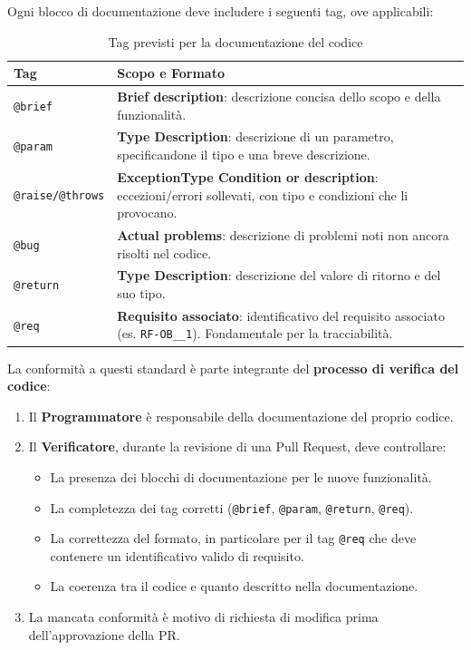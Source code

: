 Ogni blocco di documentazione deve includere i seguenti tag, ove applicabili:
\begin{table}[H]
	\centering
	\renewcommand{\arraystretch}{1.15}
	\begin{tabular}{|p{}|p{}|}
	    \hline
	    \textbf{Tag} & \textbf{Scopo e Formato} \\
	    \hline
	    \texttt{@brief} & \textbf{Brief description}: descrizione concisa dello scopo e della funzionalità. \\
	    \hline
	    \texttt{@param} & \textbf{Type Description}: descrizione di un parametro, specificandone il tipo e una breve descrizione. \\
	    \hline
	    \texttt{@raise/@throws} & \textbf{ExceptionType Condition or description}: eccezioni/errori sollevati, con tipo e condizioni che li provocano. \\
	    \hline
	    \texttt{@bug} & \textbf{Actual problems}: descrizione di problemi noti non ancora risolti nel codice. \\
	    \hline
	    \texttt{@return} & \textbf{Type Description}: descrizione del valore di ritorno e del suo tipo. \\
	    \hline
	    \texttt{@req} & \textbf{Requisito associato}: identificativo del requisito associato (es. \texttt{RF-OB\_\_1}). Fondamentale per la tracciabilità. \\
	    \hline
	\end{tabular}
	\caption{Tag previsti per la documentazione del codice}
\end{table}

	La conformità a questi standard è parte integrante del \textbf{processo di verifica del codice}:
	\begin{enumerate}[itemsep=3pt, parsep=1pt, label=\arabic*.]
		\item Il \textbf{Programmatore} è responsabile della documentazione del proprio codice.
		\item Il \textbf{Verificatore}, durante la revisione di una Pull Request, deve controllare:
		\begin{itemize}[itemsep=2pt, parsep=1pt, label=$\circ$]
			\item La presenza dei blocchi di documentazione per le nuove funzionalità.
			\item La completezza dei tag corretti (\texttt{@brief}, \texttt{@param}, \texttt{@return}, \texttt{@req}).
			\item La correttezza del formato, in particolare per il tag \texttt{@req} che deve contenere un identificativo valido di requisito.
			\item La coerenza tra il codice e quanto descritto nella documentazione.
		\end{itemize}
		\item La mancata conformità è motivo di richiesta di modifica prima dell'approvazione della PR.
	\end{enumerate}

